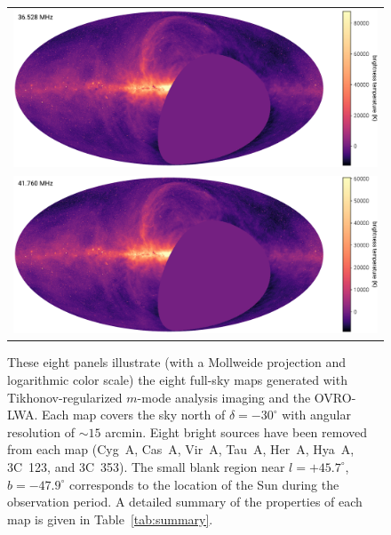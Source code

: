 \documentclass[twocolumn]{aastex61}
\begin{document}
\begin{figure}[ht]
    \centering
    \begin{tabular}{c}
        \includegraphics[height=0.32\textheight]{figures/channel-maps/spw04} \\
        \includegraphics[height=0.32\textheight]{figures/channel-maps/spw06} \\
    \end{tabular}
    \caption{
        These eight panels illustrate (with a Mollweide projection and logarithmic color scale) the
        eight full-sky maps generated with Tikhonov-regularized $m$-mode analysis imaging and the
        OVRO-LWA.  Each map covers the sky north of $\delta=-30^\circ$ with angular resolution of
        $\sim15$ arcmin. Eight bright sources have been removed from each map (Cyg~A, Cas~A, Vir~A,
        Tau~A, Her~A, Hya~A, 3C~123, and 3C~353). The small blank region near $l=+45.7^\circ$,
        $b=-47.9^\circ$ corresponds to the location of the Sun during the observation period.  A
        detailed summary of the properties of each map is given in Table~\ref{tab:summary}.
    }
    \label{fig:channel-maps}
\end{figure}
\end{document}
